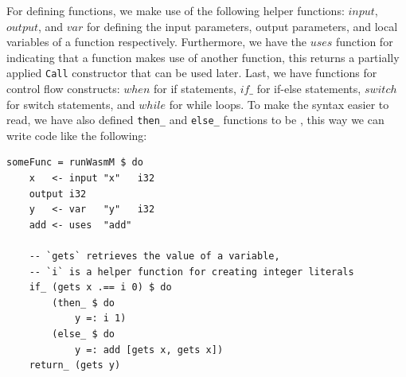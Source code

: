For defining functions, we make use of the following helper functions: $input$, $output$, and $var$ for defining the input parameters, output parameters, and local variables of a function respectively. Furthermore, we have the $uses$ function for indicating that a function makes use of another function, this returns a partially applied \texttt{Call} constructor that can be used later. Last, we have functions for control flow constructs: $when$ for if statements, $if\_$ for if-else statements, $switch$ for switch statements, and $while$ for while loops. To make the syntax easier to read, we have also defined \texttt{then\_} and \texttt{else\_} functions to be , this way we can write code like the following:
\begin{verbatim}
someFunc = runWasmM $ do
    x   <- input "x"   i32
    output i32
    y   <- var   "y"   i32
    add <- uses  "add"

    -- `gets` retrieves the value of a variable, 
    -- `i` is a helper function for creating integer literals
    if_ (gets x .== i 0) $ do
        (then_ $ do
            y =: i 1)
        (else_ $ do
            y =: add [gets x, gets x])
    return_ (gets y)
\end{verbatim}

